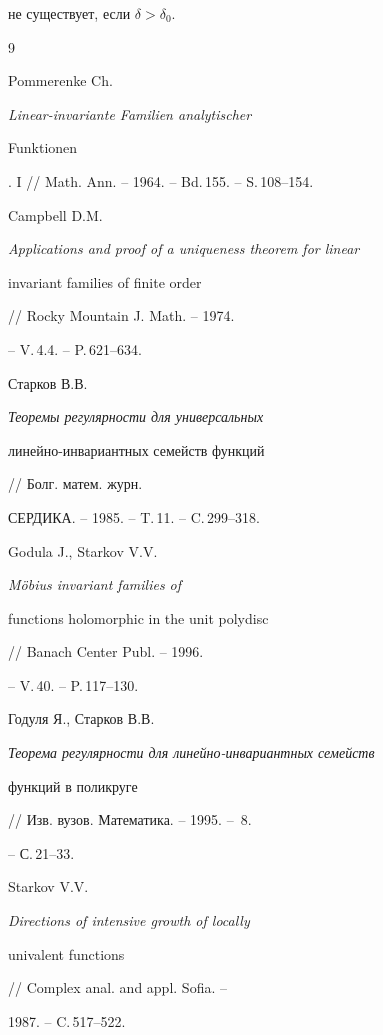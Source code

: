 не существует, если $\delta>\delta_0$. 





\begin{thebibliography}{9}







Pommerenke Ch. {\em Linear-invariante Familien analytischer


Funktionen}. I // Math. Ann. -- 1964. -- Bd.\,155. -- S.\,108--154.




Campbell D.M. {\em Applications and proof of a uniqueness theorem for linear


invariant families of finite order} // Rocky Mountain J. Math. -- 1974.


-- V.\,4.4. -- P.\,621--634.




Старков В.В. {\em Теоремы регулярности для универсальных


линейно-инвариантных семейств функций} // Болг. матем. журн.


СЕРДИКА. -- 1985. -- T.\,11. -- C.\,299--318.




Godula J., Starkov V.V. {\em M\"{o}bius invariant families of


functions holomorphic in the unit polydisc} // Banach Center Publ. -- 1996.


-- V.\,40. -- P.\,117--130.




Годуля Я., Старков В.В.


{\em Теорема регулярности для линейно-инвариантных семейств


функций в поликруге} // Изв. вузов. Математика. -- 1995. -- \No\,8.


-- С.\,21--33.




Starkov V.V. {\em Directions of intensive growth of locally


univalent functions} // Complex anal. and appl. Sofia. --


1987. -- C.\,517--522.





\end{thebibliography}





\vskip 2cm














\label{end}





